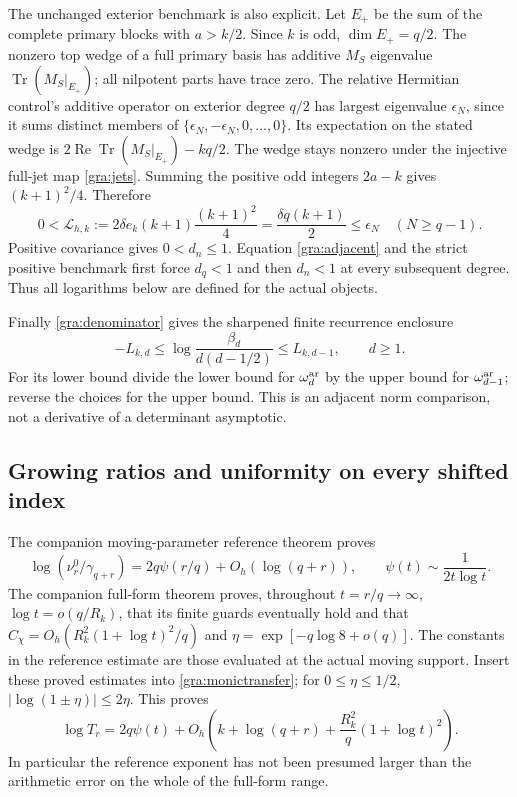 \documentclass[11pt,a4paper]{article}
\begin{document}
The unchanged exterior benchmark is also explicit.  Let $E_+$ be the
sum of the complete primary blocks with $a>k/2$.  Since $k$ is odd,
$\dim E_+=q/2$.  The nonzero top wedge of a full primary basis has
additive $M_S$ eigenvalue $\operatorname{Tr}(M_S|_{E_+})$; all nilpotent
parts have trace zero.  The relative Hermitian control's additive
operator on exterior degree $q/2$ has largest eigenvalue $\epsilon_N$,
since it sums distinct members of
$\{\epsilon_N,-\epsilon_N,0,\ldots,0\}$.  Its expectation on the stated
wedge is $2\operatorname{Re}\operatorname{Tr}(M_S|_{E_+})-kq/2$.
The wedge stays nonzero under the injective full-jet map
\eqref{gra:jets}.  Summing the positive odd integers $2a-k$ gives
$(k+1)^2/4$.  Therefore
\begin{equation}
 0<\mathcal L_{h,k}:=
 2\delta e_k(k+1)\frac{(k+1)^2}{4}
 =\frac{\delta q(k+1)}2\le\epsilon_N\quad(N\ge q-1).
 \tag{GRA16}\label{gra:benchmark}
\end{equation}
Positive covariance gives $0<d_n\le1$.  Equation
\eqref{gra:adjacent} and the strict positive benchmark first force
$d_q<1$ and then $d_n<1$ at every subsequent degree.  Thus all
logarithms below are defined for the actual objects.

Finally \eqref{gra:denominator} gives the sharpened finite recurrence
enclosure
\begin{equation}
 -L_{k,d}\le
 \log\frac{\beta_d}{d(d-1/2)}
 \le L_{k,d-1},\qquad d\ge1.
 \tag{GRA17}\label{gra:recurrence}
\end{equation}
For its lower bound divide the lower bound for $\omega_d^{\rm ar}$
by the upper bound for $\omega_{d-1}^{\rm ar}$; reverse the choices for
the upper bound.  This is an adjacent norm comparison, not a derivative
of a determinant asymptotic.

\subsection{Growing ratios and uniformity on every shifted index}

The companion moving-parameter reference theorem proves
\[
 \log(\nu_r^0/\gamma_{q+r})=2q\psi(r/q)+O_h(\log(q+r)),
 \qquad \psi(t)\sim\frac1{2t\log t}.
\]
The companion full-form theorem proves, throughout
$t=r/q\to\infty$, $\log t=o(q/R_k)$, that its finite guards eventually
hold and that
$C_\chi=O_h(R_k^2(1+\log t)^2/q)$ and
$\eta=\exp[-q\log8+o(q)]$.  The constants in the reference estimate
are those evaluated at the actual moving support.  Insert these proved
estimates into \eqref{gra:monictransfer}; for $0\le\eta\le1/2$,
$|\log(1\pm\eta)|\le2\eta$.  This proves
\begin{equation}
 \log T_r=2q\psi(t)+
 O_h\left(k+\log(q+r)+\frac{R_k^2}{q}(1+\log t)^2\right).
 \tag{GRA18}\label{gra:scalar}
\end{equation}
In particular the reference exponent has not been presumed larger than
the arithmetic error on the whole of the full-form range.
\end{document}
